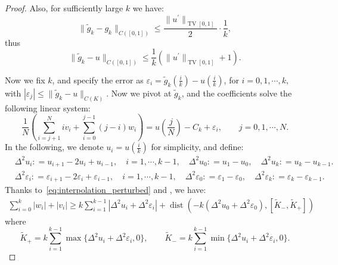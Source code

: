 \documentclass[12pt]{amsart}
\numberwithin{equation}{section}
\theoremstyle{remark}
\begin{document}
\begin{proof}
Also, for sufficiently large $k$ we have:
\begin{equation}
    \|\tilde g_k-g_k\|_{C([0,1])}\le \frac{\|{u^\prime}\|_{\operatorname{TV}[0,1]}}{2} \cdot \frac{1}{k},
\end{equation}
thus
\begin{equation}
    \|\tilde g_k-u\|_{C([0,1])}\le \frac{1}{k}(\|{u^\prime}\|_{\operatorname{TV}[0,1]}+ 1).
\end{equation}


Now we fix $k$, and specify the error as
$\varepsilon_i = \tilde g_k(\frac i k)-u(\frac i k)$,
for $ i=0,1,\cdots, k,$ with  $|\varepsilon_j|\le  \|\tilde g_k-u\|_{C(K)}$.
Now we pivot at $\tilde g_k$, and the coefficients solve the following linear system:
\begin{equation}
    \label{eq:interpolation_perturbed}
    \frac{1}{N}(\sum_{i=j+1}^N iv_i+\sum_{i=0}^{j-1} (j-i)w_i)=u(\frac j N) -C_k+ \varepsilon_i, \qquad j=0,1, \cdots,N.
\end{equation}
In the following, we denote $u_i=u(\frac i k)$ for simplicity, and define:
\begin{equation}
    \begin{aligned}
            &\Delta^2 u_i: = u_{i+1}-2u_i+u_{i-1}, \quad i=1, \cdots, k-1, \quad \Delta^2 u_0: = u_1-u_0, \quad \Delta^2 u_k: = u_k-u_{k-1}.\\
            &\Delta^2 \varepsilon_i: = \varepsilon_{i+1}-2\varepsilon_i+\varepsilon_{i-1}, \quad i=1, \cdots, k-1, \quad\Delta^2 \varepsilon_0: = \varepsilon_1-\varepsilon_0, \quad \Delta^2 \varepsilon_k: = \varepsilon_k-\varepsilon_{k-1}.
    \end{aligned}
\end{equation}
Thanks to~\eqref{eq:interpolation_perturbed} and , we have:
\begin{equation}
    \label{eq:weight_sum_estimation_perturbed}
    \begin{aligned}
            \sum_{i=0}^{k} |w_i|+|v_i| \ge  k\sum_{i=1}^{k-1} |\Delta^2 u_i+\Delta^2 \varepsilon_i| + \operatorname{dist}\left( - k(\Delta^2 u_0+\Delta^2 \varepsilon_0),[\widetilde K_-, \widetilde K_+] \right)
    \end{aligned}
\end{equation}
where
\begin{equation}
    \widetilde K_+ = k \sum_{i=1}^{k-1} \max\{\Delta^2 u_i+\Delta^2 \varepsilon_i, 0\}, \qquad \widetilde K_- = k\sum_{i=1}^{k-1} \min\{\Delta^2 u_i+\Delta^2 \varepsilon_i, 0\}.
\end{equation}

\end{proof}
\end{document}
